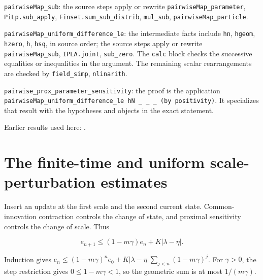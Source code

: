 \documentclass[11pt,a4paper]{article}
\begin{document}
\begin{leanbox}
\texttt{pairwise\allowbreak{}Map\_\allowbreak{}sub}: the source steps apply or rewrite \texttt{pairwise\allowbreak{}Map\_\allowbreak{}parameter}, \texttt{Pi\allowbreak{}Lp.\allowbreak{}sub\_\allowbreak{}apply}, \texttt{Finset.\allowbreak{}sum\_\allowbreak{}sub\_\allowbreak{}distrib}, \texttt{mul\_\allowbreak{}sub}, \texttt{pairwise\allowbreak{}Map\_\allowbreak{}particle}.



\texttt{pairwise\allowbreak{}Map\_\allowbreak{}uniform\_\allowbreak{}difference\_\allowbreak{}le}: the intermediate facts include \texttt{hn}, \texttt{hgeom}, \texttt{hzero}, \texttt{h}, \texttt{hsq}, in source order; the source steps apply or rewrite \texttt{pairwise\allowbreak{}Map\_\allowbreak{}sub}, \texttt{IPLA.\allowbreak{}joint}, \texttt{sub\_\allowbreak{}zero}. The \texttt{calc} block checks the successive equalities or inequalities in the argument. The remaining scalar rearrangements are checked by \texttt{field\_\allowbreak{}simp}, \texttt{nlinarith}.



\texttt{pairwise\_\allowbreak{}prox\_\allowbreak{}parameter\_\allowbreak{}sensitivity}: the proof is the application \texttt{pairwise\allowbreak{}Map\_\allowbreak{}uniform\_\allowbreak{}difference\_\allowbreak{}le h\allowbreak{}N \_\allowbreak{} \_\allowbreak{} \_\allowbreak{} (by positivity)}. It specializes that result with the hypotheses and objects in the exact statement.
\end{leanbox}


Earlier results used here: \cite[Section~3.1.1]{LangevinLean2026IPLA}.

\section{\texorpdfstring{The finite-time and uniform scale-perturbation estimates}{The finite-time and uniform scale-perturbation estimates}}


Insert an update at the first scale and the second current state. Common-innovation contraction controls the change of state, and proximal sensitivity controls the change of scale. Thus

\[e_{n+1}\le(1-m\gamma)e_n+K|\lambda-\eta|.\]

Induction gives \(e_n\le(1-m\gamma)^ne_0+K|\lambda-\eta|\sum_{j<n}(1-m\gamma)^j\). For \(\gamma>0\), the step restriction gives \(0\le1-m\gamma<1\), so the geometric sum is at most \(1/(m\gamma)\).
\end{document}
